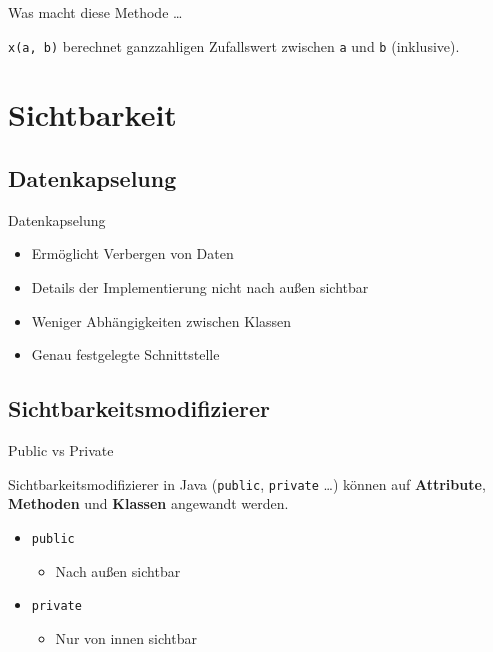 \documentclass[18pt]{beamer}
\begin{document}
\begin{frame}{Was macht diese Methode \dots}
    \begin{exampleblock}{}
        \texttt{x(a, b)} berechnet ganzzahligen Zufallswert zwischen \texttt{a} und \texttt{b} (inklusive).
    \end{exampleblock}
\end{frame}

\section{Sichtbarkeit}

\subsection{Datenkapselung}

\begin{frame}{Datenkapselung}
    \begin{itemize}
        \item Ermöglicht Verbergen von Daten
        \item Details der Implementierung nicht nach außen sichtbar
        \item Weniger Abhängigkeiten zwischen Klassen
        \item Genau festgelegte Schnittstelle
    \end{itemize}
\end{frame}

\subsection{Sichtbarkeitsmodifizierer}

\begin{frame}{Public vs Private}

    Sichtbarkeitsmodifizierer in Java (\texttt{public}, \texttt{private} \dots) können auf \textbf{Attribute}, \textbf{Methoden} und \textbf{Klassen} angewandt werden.
    \begin{itemize}
        \item \texttt{public}
        \begin{itemize}
            \item Nach außen sichtbar
        \end{itemize}
        \item \texttt{private}
        \begin{itemize}
            \item Nur von innen sichtbar
        \end{itemize}
    \end{itemize}
\end{frame}
\end{document}
